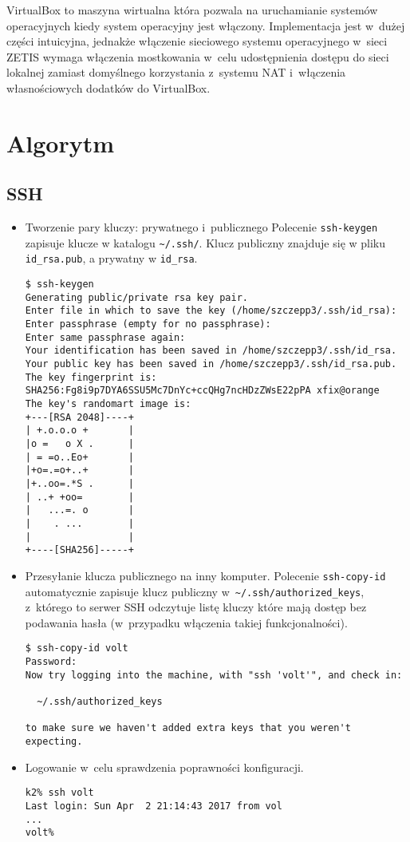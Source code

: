 \documentclass[a4paper,11pt]{article}
\begin{document}
VirtualBox to maszyna wirtualna która pozwala na uruchamianie systemów
operacyjnych kiedy system operacyjny jest włączony. Implementacja jest
w~dużej części intuicyjna, jednakże włączenie sieciowego systemu operacyjnego
w~sieci ZETIS wymaga włączenia mostkowania w~celu udostępnienia dostępu
do sieci lokalnej zamiast domyślnego korzystania z~systemu NAT i~włączenia
własnościowych dodatków do VirtualBox.




\section{Algorytm}

\subsection{SSH}

\begin{itemize}

\item Tworzenie pary kluczy: prywatnego i~publicznego
Polecenie \verb|ssh-keygen| zapisuje klucze w katalogu \verb|~/.ssh/|. Klucz publiczny znajduje się w pliku \verb|id_rsa.pub|, a prywatny w \verb|id_rsa|.


\begin{verbatim}
$ ssh-keygen 
Generating public/private rsa key pair.
Enter file in which to save the key (/home/szczepp3/.ssh/id_rsa): 
Enter passphrase (empty for no passphrase): 
Enter same passphrase again: 
Your identification has been saved in /home/szczepp3/.ssh/id_rsa.
Your public key has been saved in /home/szczepp3/.ssh/id_rsa.pub.
The key fingerprint is:
SHA256:Fg8i9p7DYA6SSU5Mc7DnYc+ccQHg7ncHDzZWsE22pPA xfix@orange
The key's randomart image is:
+---[RSA 2048]----+
| +.o.o.o +       |
|o =   o X .      |
| = =o..Eo+       |
|+o=.=o+..+       |
|+..oo=.*S .      |
| ..+ +oo=        |
|   ...=. o       |
|    . ...        |
|                 |
+----[SHA256]-----+
\end{verbatim}

\item Przesyłanie klucza publicznego na inny komputer. Polecenie
\verb|ssh-copy-id| automatycznie zapisuje klucz publiczny
w~\verb|~/.ssh/authorized_keys|, z~którego to serwer SSH odczytuje
listę kluczy które mają dostęp bez podawania hasła (w~przypadku
włączenia takiej funkcjonalności).

\begin{verbatim}
$ ssh-copy-id volt
Password: 
Now try logging into the machine, with "ssh 'volt'", and check in:

  ~/.ssh/authorized_keys

to make sure we haven't added extra keys that you weren't expecting.
\end{verbatim}

\item Logowanie w~celu sprawdzenia poprawności konfiguracji.

\begin{verbatim}
k2% ssh volt
Last login: Sun Apr  2 21:14:43 2017 from vol
...
volt%
\end{verbatim}

\end{itemize}
\end{document}
